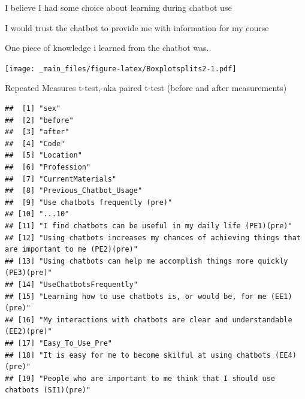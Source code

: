 \documentclass[a4paper, nobind]{templates/ociamthesis}
\begin{document}
I believe I had some choice about learning during chatbot use

I would trust the chatbot to provide me with information for my course

One piece of knowledge i learned from the chatbot was..

\texttt{[image: \_main\_files/figure-latex/Boxplotsplits2-1.pdf]}

Repeated Measures t-test, aka paired t-test (before and after measurements)

\begin{verbatim}
##  [1] "sex"                                                                                            
##  [2] "before"                                                                                         
##  [3] "after"                                                                                          
##  [4] "Code"                                                                                           
##  [5] "Location"                                                                                       
##  [6] "Profession"                                                                                     
##  [7] "CurrentMaterials"                                                                               
##  [8] "Previous_Chatbot_Usage"                                                                         
##  [9] "Use chatbots frequently (pre)"                                                                  
## [10] "...10"                                                                                          
## [11] "I find chatbots can be useful in my daily life (PE1)(pre)"                                      
## [12] "Using chatbots increases my chances of achieving things that are important to me (PE2)(pre)"    
## [13] "Using chatbots can help me accomplish things more quickly (PE3)(pre)"                           
## [14] "UseChatbotsFrequently"                                                                          
## [15] "Learning how to use chatbots is, or would be, for me (EE1)(pre)"                                
## [16] "My interactions with chatbots are clear and understandable (EE2)(pre)"                          
## [17] "Easy_To_Use_Pre"                                                                                
## [18] "It is easy for me to become skilful at using chatbots (EE4)(pre)"                               
## [19] "People who are important to me think that I should use chatbots (SI1)(pre)"                     

\end{verbatim}
\end{document}
